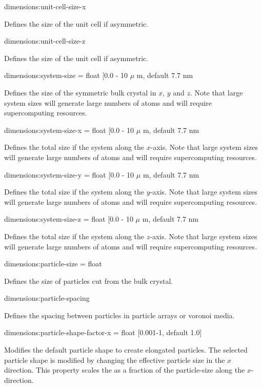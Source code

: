 {\zicf dimensions:unit-cell-size-x} Defines the size of the unit cell if asymmetric.

{\zicf dimensions:unit-cell-size-z} Defines the size of the unit cell if asymmetric.

{\zicf dimensions:system-size = float [0.0 - 10 $\mu$ m, default 7.7 nm}
Defines the size of the symmetric bulk crystal in $x$, $y$ and $z$. Note that
large system sizes will generate large numbers of atoms and will require
supercomputing resources.

{\zicf dimensions:system-size-x = float [0.0 - 10 $\mu$ m, default 7.7 nm}
Defines the total size if the system along the $x$-axis. Note that
large system sizes will generate large numbers of atoms and will require
supercomputing resources.

{\zicf dimensions:system-size-y = float [0.0 - 10 $\mu$ m, default 7.7 nm}
Defines the total size if the system along the $y$-axis. Note that
large system sizes will generate large numbers of atoms and will require
supercomputing resources.

{\zicf dimensions:system-size-z = float [0.0 - 10 $\mu$ m, default 7.7 nm}
Defines the total size if the system along the $z$-axis. Note that
large system sizes will generate large numbers of atoms and will require
supercomputing resources.

{\zicf dimensions:particle-size = float} Defines the size of particles cut from the bulk crystal.

{\zicf dimensions:particle-spacing} Defines the spacing between particles in particle arrays or voronoi media.


{\zicf dimensions:particle-shape-factor-x = float [0.001-1, default 1.0]} 
Modifies the default particle shape to create elongated particles. The selected
particle shape is modified by changing the effective particle size in the $x$
direction. This property scales the as a fraction of the particle-size along the
$x$-direction.

